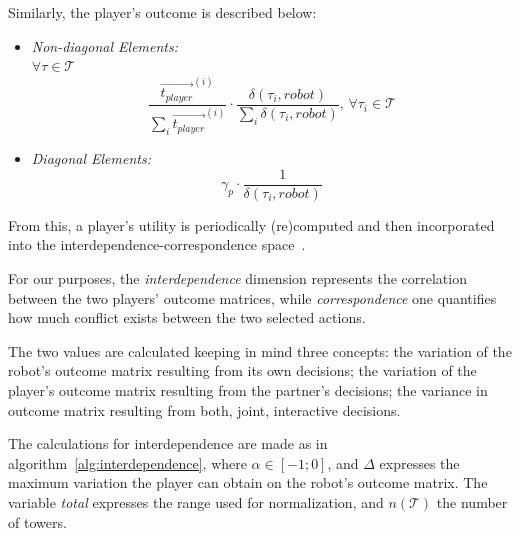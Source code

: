 \begin{itemize}
\end{itemize}

Similarly, the player's outcome is described below:
\begin{itemize}
\item \textit{Non-diagonal Elements:}\\
$\forall\tau \in \mathcal{T}$\\
\begin{equation}
 \frac{\overrightarrow{t_{player}}^{(i)}}{\sum_{i}{\overrightarrow{t_{player}}^{(i)}}} \cdot \frac{\delta(\tau_{i},robot)}{\sum_{i}{\delta(\tau_{i},robot)}}, \, \forall\tau_{i} \in \mathcal{T} 
\end{equation}
\item \textit{Diagonal Elements:}
\begin{equation}
\gamma_p \cdot \frac{1}{\delta(\tau_{i},robot)}
\end{equation}
\end{itemize}

From this, a player's utility is periodically (re)computed and then incorporated into the interdependence-correspondence space~\cite{wagner2011acting}.

For our purposes, the \textit{interdependence} dimension represents the correlation between the two players' outcome matrices, while \textit{correspondence} one quantifies how much conflict exists between the two selected actions.

The two values are calculated keeping in mind three concepts: the variation of the robot's outcome matrix resulting from its own decisions; the variation of the player's outcome matrix resulting from the partner's decisions; the variance in outcome matrix resulting from both, joint, interactive decisions.

The calculations for interdependence are made as in algorithm~\ref{alg:interdependence}, where $\alpha \in[-1;0]$, and $\Delta$ expresses the maximum variation the player can obtain on the robot's outcome matrix. The variable \textit{total} expresses the range used for normalization, and $n(\mathcal{T})$ the number of towers.

